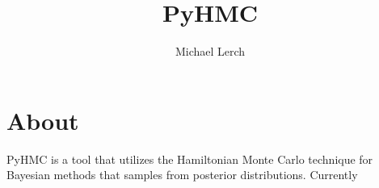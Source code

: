 \documentclass[10pt,letterpaper]{article}
\author{Michael Lerch}
\title{PyHMC}
\date{}
\begin{document}
\maketitle

\section{About}
\label{sec:about}

PyHMC is a tool that utilizes the Hamiltonian Monte Carlo technique for
Bayesian methods that samples from posterior distributions.  Currently

\end{document}

